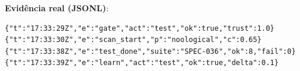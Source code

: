 \textbf{Evidência real (JSONL)}:
\begin{verbatim}
{"t":"17:33:29Z","e":"gate","act":"test","ok":true,"trust":1.0}
{"t":"17:33:30Z","e":"scan_start","p":"noological","c":0.65}
{"t":"17:33:38Z","e":"test_done","suite":"SPEC-036","ok":8,"fail":0}
{"t":"17:33:39Z","e":"learn","act":"test","ok":true,"delta":0.1}
\end{verbatim}
